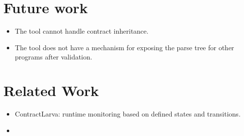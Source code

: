 \documentclass[a4paper]{article}
\begin{document}
\section{Future work}
\begin{itemize}
  \item The tool cannot handle contract inheritance.
  \item The tool does not have a mechanism for exposing the parse tree for other programs after validation.
\end{itemize}

\section{Related Work}
\begin{itemize}
  \item ContractLarva: runtime monitoring based on defined states and transitions.
  \item 
\end{itemize}



\end{document}
